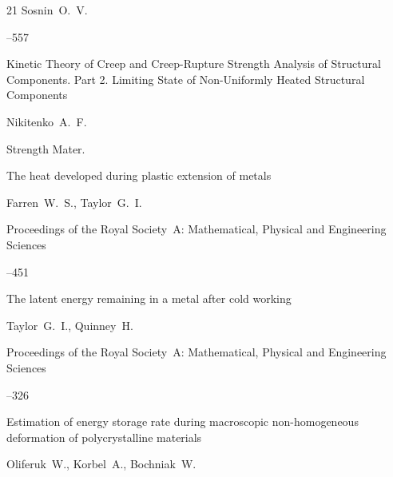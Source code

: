\begin{thebibliography}{21}
\by Sosnin~O.~V.










–557

\paper Kinetic Theory of Creep and Creep-Rupture Strength Analysis of Structural Components. Part 2. Limiting State of Non-Uniformly Heated Structural Components

\by  Nikitenko~A.~F.


\jour  Strength Mater.




\paper The heat developed during plastic extension of metals

\by Farren~W.~S., Taylor~G.~I.

\jour Proceedings of the Royal Society~A: Mathematical, Physical and Engineering Sciences




--451





\paper The latent energy remaining in a metal after cold working

\by  Taylor~G.~I., Quinney~H.

\jour Proceedings of the Royal Society~A: Mathematical, Physical and Engineering Sciences




--326





\paper Estimation of energy storage rate during macroscopic non-homogeneous deformation of polycrystalline materials

\by  Oliferuk~W., Korbel~A., Bochniak~W.


\end{thebibliography}
